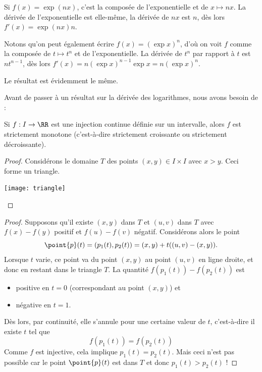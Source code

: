 \begin{frame}
  \begin{example}%
    Si \(f(x) = \exp{(nx)}\), c'est la composée de l'exponentielle et de \(x\mapsto nx\). La dérivée de l'exponentielle est elle-même, la dérivée de \(nx\) est \(n\), dès lors \(f'(x) = \exp{(nx)} n\).\pause

    Notons qu'on peut également écrire \(f(x) = (\exp{x})^{n}\), d'où on voit \(f\) comme la composée de \(t\mapsto t^{n}\) et de l'exponentielle. La dérivée de \(t^{n}\) par rapport à \(t\) est \(n t^{n-1}\), dès lors \(f'(x) = n (\exp{x})^{n-1} \exp{x} = n (\exp{x})^{n}\).\pause

    Le résultat est évidemment le même.
  \end{example}
\end{frame}
\begin{frame} %
  Avant de passer à un résultat sur la dérivée des logarithmes, nous avons besoin de :
  \begin{lemma}
    Si \(f : I \to \RR\) est une injection continue définie sur un intervalle, alors \(f\) est strictement monotone (c'est-à-dire strictement croissante ou strictement décroissante).
  \end{lemma}
  \begin{proof}%
    Considérons le domaine \(T\) des points \((x,y)\in I \times I\) avec \(x > y\). Ceci forme un triangle.

    \begin{center}
      \texttt{[image: triangle]} 
    \end{center}
  \end{proof}
\end{frame}
\begin{frame}%
  \begin{proof}
    Supposons qu'il existe \((x,y)\) dans \(T\) et \((u,v)\) dans \(T\) avec \(f(x)-f(y)\) positif et \(f(u)-f(v)\) négatif.\pause{} Considérons alors le point
    \begin{equation*}
      \point{p}(t) = (p_{1}(t), p_{2}(t)) = (x,y) + t((u,v)-(x,y)).
    \end{equation*}\pause
    Lorsque \(t\) varie, ce point va du point \((x,y)\) au point \((u,v)\) en ligne droite, et donc en restant dans le triangle \(T\).\pause{} La quantité \(f(p_{1}(t))-f(p_{2}(t))\) est\pause
    \begin{itemize}
    \item positive en \(t = 0\) (correspondant au point \((x,y)\)) et\pause
    \item négative en \(t = 1\).
    \end{itemize}\pause
    Dès lors, par continuité, elle s'annule pour une certaine valeur de \(t\)\pause, c'est-à-dire il existe \(t\) tel que
    \begin{equation*}
      f(p_{1}(t)) = f(p_{2}(t))
    \end{equation*}
    Comme \(f\) est injective, cela implique \(p_{1}(t) = p_{2}(t)\). Mais ceci n'est pas possible car le point \(\point{p}(t)\) est dans \(T\) et donc \(p_{1}(t) > p_{2}(t)\) !
  \end{proof}
\end{frame}
